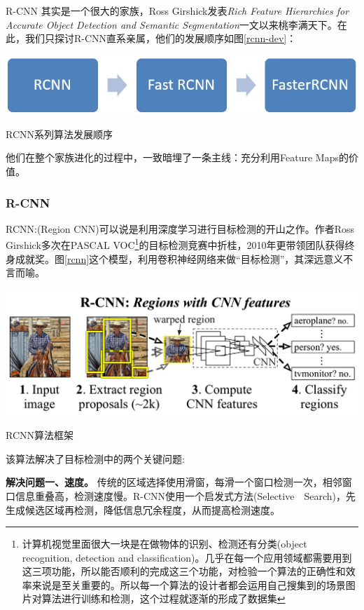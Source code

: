 R-CNN 其实是一个很大的家族，Ross Girshick发表\textit{Rich Feature Hierarchies for Accurate Object Detection and Semantic Segmentation}\cite{rcnn}一文以来桃李满天下。在此，我们只探讨R-CNN直系亲属，他们的发展顺序如图\ref{rcnn-dev}：
\begin{uscfigure}
	\includegraphics[width=\textwidth]{./Pictures/rcnn.jpg}	
	\caption{RCNN系列算法发展顺序}
	\label{rcnn-dev}
\end{uscfigure}

\par \noindent
他们在整个家族进化的过程中，一致暗埋了一条主线：充分利用Feature Maps的价值。

\subsubsection{R-CNN}
RCNN:(Region CNN)\cite{rcnn}可以说是利用深度学习进行目标检测的开山之作。作者Ross Girshick多次在PASCAL VOC\footnote{计算机视觉里面很大一块是在做物体的识别、检测还有分类(object recognition, detection and classification)。几乎在每一个应用领域都需要用到这三项功能，所以能否顺利的完成这三个功能，对检验一个算法的正确性和效率来说是至关重要的。所以每一个算法的设计者都会运用自己搜集到的场景图片对算法进行训练和检测，这个过程就逐渐的形成了数据集}的目标检测竞赛中折桂，2010年更带领团队获得终身成就奖。图\ref{rcnn}这个模型，利用卷积神经网络来做“目标检测”，其深远意义不言而喻。
\begin{uscfigure}
	\includegraphics[width=\textwidth]{./Pictures/rcnn-regions_with_cnn_features.png}	
	\caption{RCNN算法框架}
	\label{rcnn}
\end{uscfigure}
该算法解决了目标检测中的两个关键问题:

\textbf{解决问题一、速度。}
传统的区域选择使用滑窗，每滑一个窗口检测一次，相邻窗口信息重叠高，检测速度慢。R-CNN使用一个启发式方法(Selective　Search\cite{ss})，先生成候选区域再检测，降低信息冗余程度，从而提高检测速度。

